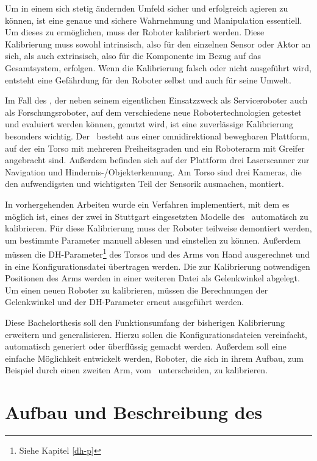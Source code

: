 Um in einem sich stetig ändernden Umfeld sicher und erfolgreich agieren zu 
können, ist eine genaue und sichere Wahrnehmung und Manipulation essentiell. 
Um dieses zu ermöglichen, muss der Roboter kalibriert werden. Diese Kalibrierung 
muss sowohl intrinsisch, also für den einzelnen Sensor oder Aktor an sich, als 
auch extrinsisch, also für die Komponente im Bezug auf das Gesamtsystem, erfolgen. 
Wenn die Kalibrierung falsch oder nicht ausgeführt wird, entsteht
eine Gefährdung für den Roboter selbst und auch für seine Umwelt. 

Im Fall des \cob, der neben seinem eigentlichen Einsatzzweck als Serviceroboter auch
als Forschungsroboter, auf dem verschiedene neue Robotertechnologien getestet 
und evaluiert werden können, genutzt wird, ist eine zuverlässige Kalibrierung 
besonders wichtig. Der \cob\ besteht aus einer omnidirektional bewegbaren 
Plattform, auf der ein Torso mit mehreren Freiheitsgraden und ein Roboterarm 
mit Greifer angebracht sind. Außerdem befinden sich auf der Plattform drei 
Laserscanner zur Navigation und Hindernis-/Objekterkennung. Am Torso sind drei 
Kameras, die den aufwendigsten und wichtigsten Teil der Sensorik ausmachen, 
montiert.

In vorhergehenden Arbeiten wurde ein Verfahren implementiert, mit dem es möglich 
ist, eines der zwei in Stuttgart eingesetzten Modelle des \cob\ automatisch zu 
kalibrieren. Für diese Kalibrierung muss der Roboter teilweise 
demontiert werden, um bestimmte Parameter manuell ablesen und einstellen zu 
können. Außerdem müssen die \ac{DH-Parameter}\footnote{Siehe Kapitel \ref{dh-p}} des Torsos und des Arms von Hand 
ausgerechnet und in eine Konfigurationsdatei übertragen werden. Die zur 
Kalibrierung notwendigen Positionen des Arms werden in einer weiteren Datei als 
Gelenkwinkel abgelegt. Um einen neuen Roboter zu kalibrieren, müssen die 
Berechnungen der Gelenkwinkel und der \ac{DH-Parameter} erneut ausgeführt werden. 

Diese Bachelorthesis soll den Funktionsumfang der bisherigen Kalibrierung 
erweitern und generalisieren. Hierzu sollen die Konfigurationsdateien vereinfacht, 
automatisch generiert oder überflüssig gemacht werden. Außerdem soll eine 
einfache Möglichkeit entwickelt werden, Roboter, die sich in ihrem Aufbau, zum Beispiel durch 
einen zweiten Arm, vom \cob\ unterscheiden, zu kalibrieren.


\newpage
\section{Aufbau und Beschreibung des \cob}

